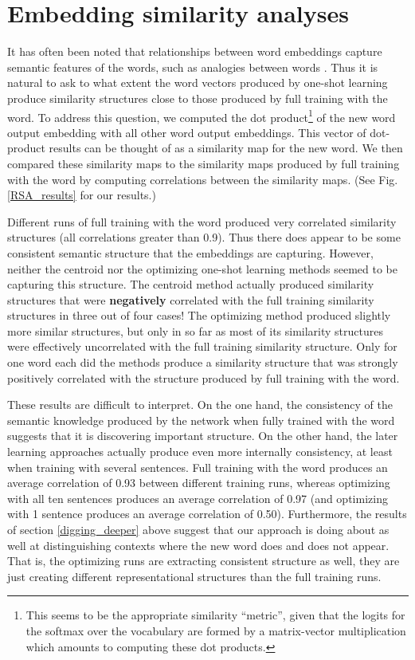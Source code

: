 \documentclass{article}
\begin{document}
\section{Embedding similarity analyses} \label{emb_sim_anal}
It has often been noted that relationships between word embeddings capture semantic features of the words, such as analogies between words \citep{Mikolov2013}. Thus it is natural to ask to what extent the word vectors produced by one-shot learning produce similarity structures close to those produced by full training with the word. To address this question, we computed the dot product\footnote{This seems to be the appropriate similarity ``metric'', given that the logits for the softmax over the vocabulary are formed by a matrix-vector multiplication which amounts to computing these dot products.} of the new word output embedding with all other word output embeddings. This vector of dot-product results can be thought of as a similarity map for the new word. We then compared these similarity maps to the similarity maps produced by full training with the word by computing correlations between the similarity maps. (See Fig. \ref{RSA_results} for our results.)\par
Different runs of full training with the word produced very correlated similarity structures (all correlations greater than 0.9). Thus there does appear to be some consistent semantic structure that the embeddings are capturing. However, neither the centroid nor the optimizing one-shot learning methods seemed to be capturing this structure. The centroid method actually produced similarity structures that were \textbf{negatively} correlated with the full training similarity structures in three out of four cases! The optimizing method produced slightly more similar structures, but only in so far as most of its similarity structures were effectively uncorrelated with the full training similarity structure. Only for one word each did the methods produce a similarity structure that was strongly positively correlated with the structure produced by full training with the word. \par
These results are difficult to interpret. On the one hand, the consistency of the semantic knowledge produced by the network when fully trained with the word suggests that it is discovering important structure. On the other hand, the later learning approaches actually produce even more internally consistency, at least when training with several sentences. Full training with the word produces an average correlation of 0.93 between different training runs, whereas optimizing with all ten sentences produces an average correlation of 0.97 (and optimizing with 1 sentence produces an average correlation of 0.50). Furthermore, the results of section \ref{digging_deeper} above suggest that our approach is doing about as well at distinguishing contexts where the new word does and does not appear. That is, the optimizing runs are extracting consistent structure as well, they are just creating different representational structures than the full training runs. \par
\end{document}
